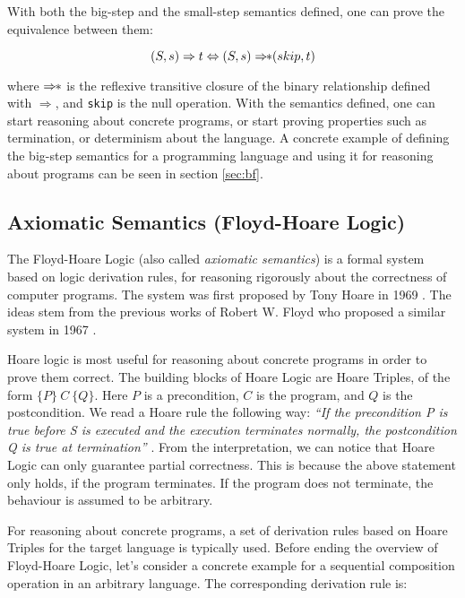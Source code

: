 \documentclass[runningheads]{llncs}
\newcommand{\cc}{\lstinline[mathescape]}
\begin{document}
With both the big-step and the small-step semantics defined, one can prove the
equivalence between them:

$$(S, s) \Rightarrow t \Leftrightarrow (S, s) \Rightarrow\hspace{-1.3mm}* (skip, t)$$

where $\Rightarrow\hspace{-1.3mm}*$ is the reflexive transitive closure of the
binary relationship defined with $\Rightarrow$, and \cc{skip} is the null
operation. With the semantics defined, one can start reasoning about concrete
programs, or start proving properties such as termination, or determinism about
the language. A concrete example of defining the big-step semantics for a
programming language and using it for reasoning about programs can be seen in
section \ref{sec:bf}.

\subsection{Axiomatic Semantics (Floyd-Hoare Logic)}

The Floyd-Hoare Logic (also called \emph{axiomatic semantics}) is a formal
system based on logic derivation rules, for reasoning rigorously about the
correctness of computer programs. The system was first proposed by Tony Hoare
in 1969 \cite{hoare}. The ideas stem from the previous works of Robert W. Floyd
who proposed a similar system in 1967 \cite{floyd}. 

Hoare logic is most useful for reasoning about concrete programs in order to
prove them correct. The building blocks of Hoare Logic are Hoare Triples, of
the form $\{P\}\ C\ \{Q\}$. Here $P$ is a precondition, $C$ is the program, and
$Q$ is the postcondition. We read a Hoare rule the following way: \emph{``If
the precondition P is true before S is executed and the execution terminates
normally, the postcondition Q is true at termination''} \cite{hitchhiker}. From
the interpretation, we can notice that Hoare Logic can only guarantee partial
correctness. This is because the above statement only holds, if the program
terminates. If the program does not terminate, the behaviour is assumed to be
arbitrary.

For reasoning about concrete programs, a set of derivation rules based on Hoare
Triples for the target language is typically used. Before ending the overview
of Floyd-Hoare Logic, let's consider a concrete example for a sequential
composition operation in an arbitrary language. The corresponding derivation
rule is:
\end{document}
